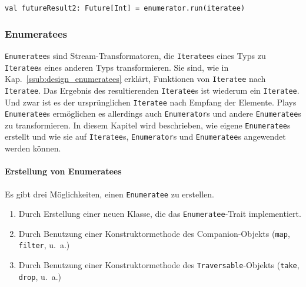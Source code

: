 \documentclass[draft=false
              ,paper=a4
              ,twoside=false
              ,fontsize=11pt
              ,headsepline
              ,BCOR10mm
              ,DIV11
              ]{scrbook}
\begin{document}
\begin{lstlisting}[caption=Anwendung eines Enumerators mit gleichzeitiger Ergebnisextrahierung, label=lst:enumeratoranwendung3]
val futureResult2: Future[Int] = enumerator.run(iteratee)
\end{lstlisting}




\subsubsection{Enumeratees} %
\label{ssub:enumeratees}

\lstinline|Enumeratee|s sind Stream-Transformatoren, die \lstinline|Iteratee|s eines Typs zu \lstinline|Iteratee|s eines anderen Typs transformieren.
Sie sind, wie in Kap.~\ref{ssub:design_enumeratees} erklärt, Funktionen von \lstinline|Iteratee| nach \lstinline|Iteratee|.
Das Ergebnis des resultierenden \lstinline|Iteratee|s ist wiederum ein \lstinline|Iteratee|.
Und zwar ist es der ursprünglichen \lstinline|Iteratee| nach Empfang der Elemente.
Plays \lstinline|Enumeratee|s ermöglichen es allerdings auch \lstinline|Enumerator|s und andere \lstinline|Enumeratee|s zu transformieren.
In diesem Kapitel wird beschrieben, wie eigene \lstinline|Enumeratee|s erstellt und wie sie auf \lstinline|Iteratee|s, \lstinline|Enumerator|s und \lstinline|Enumeratee|s angewendet werden können.

\paragraph{Erstellung von Enumeratees} %
\label{par:erstellung_von_enumeratees}\mbox{} %

Es gibt drei Möglichkeiten, einen \lstinline|Enumeratee| zu erstellen.

\begin{enumerate}
  \item Durch Erstellung einer neuen Klasse, die das \lstinline|Enumeratee|-Trait implementiert.
  \item Durch Benutzung einer Konstruktormethode des Companion-Objekts (\lstinline|map|, \lstinline|filter|, u.~a.)
  \item Durch Benutzung einer Konstruktormethode des \lstinline|Traversable|-Objekts (\lstinline|take|, \lstinline|drop|, u.~a.)
\end{enumerate}
\end{document}
